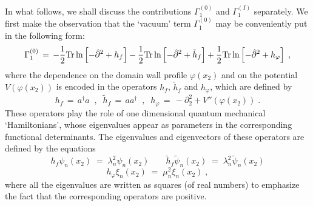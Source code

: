 \documentclass[a4paper,12pt]{article}
\begin{document}
In what follows, we shall discuss the contributions $\Gamma_1^{(0)}$
and $\Gamma_1^{(I)}$ separately.
We first make the observation that the `vacuum' term $\Gamma_1^{(0)}$
may be conveniently put in the following form:
\begin{equation}
\Gamma_1^{(0)} \,=\, -\frac{1}{2}{\rm Tr}\ln\left[-\hat{\partial}^2 + h_f \right]
-\frac{1}{2}{\rm Tr}\ln\left[-\hat{\partial}^2+{\tilde h}_f \right]
+\frac{1}{2}{\rm Tr}\ln\left[-\hat{\partial}^2 + h_\varphi \right] \;,
\end{equation}
where the dependence on the domain wall profile $\varphi (x_2)$ and on
the potential $V(\varphi(x_2))$ is encoded in the operators $h_f$,
${\tilde h}_f$ and $h_\varphi$, which are defined by
\begin{equation}
h_f \,=\, a^\dagger a \;\;,\;\; {\tilde h}_f \,=\,aa^\dagger \;\;,\;\;
h_\varphi \,=\, - \partial_2^2 + V''(\varphi(x_2)) \;.
\end{equation}
These operators play the role of  one dimensional quantum mechanical 
`Hamiltonians', whose eigenvalues appear as parameters in
the corresponding functional determinants. The eigenvalues and 
eigenvectors of these operators are defined by the equations
$$
h_f \psi_n(x_2) \;=\; \lambda_n^2 \psi_n(x_2) \;\;\;\;\;\;\; {\tilde h}_f {\tilde \psi}_n(x_2) \;=\;
\lambda_n^2 {\tilde \psi}_n(x_2) 
$$
\begin{equation}
h_\varphi \xi_n(x_2) \;=\; \mu_n^2  \xi_n(x_2) \;,
\end{equation}
where all the eigenvalues are written as squares (of real numbers) to
emphasize the fact that the corresponding operators are positive.
\end{document}
